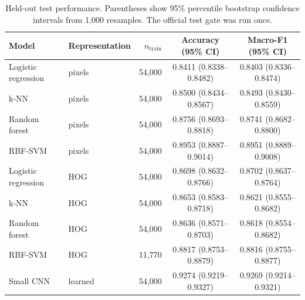 \begin{table}[t]
\centering
\caption{Held-out test performance. Parentheses show 95\% percentile bootstrap confidence intervals from 1,000 resamples. The official test gate was run once.}
\label{tab:results}
\small
\begin{tabular}{llrcc}
\toprule
Model & Representation & $n_{\mathrm{train}}$ & Accuracy (95\% CI) & Macro-F1 (95\% CI) \\
\midrule
Logistic regression & pixels & 54,000 & 0.8411 (0.8338--0.8482) & 0.8403 (0.8336--0.8474) \\
k-NN & pixels & 54,000 & 0.8500 (0.8434--0.8567) & 0.8493 (0.8430--0.8559) \\
Random forest & pixels & 54,000 & 0.8756 (0.8693--0.8818) & 0.8741 (0.8682--0.8800) \\
RBF-SVM & pixels & 54,000 & 0.8953 (0.8887--0.9014) & 0.8951 (0.8889--0.9008) \\
Logistic regression & HOG & 54,000 & 0.8698 (0.8632--0.8766) & 0.8702 (0.8637--0.8764) \\
k-NN & HOG & 54,000 & 0.8653 (0.8583--0.8718) & 0.8621 (0.8555--0.8682) \\
Random forest & HOG & 54,000 & 0.8636 (0.8571--0.8703) & 0.8618 (0.8554--0.8682) \\
RBF-SVM & HOG & 11,770 & 0.8817 (0.8753--0.8879) & 0.8816 (0.8755--0.8877) \\
Small CNN & learned & 54,000 & 0.9274 (0.9219--0.9327) & 0.9269 (0.9214--0.9321) \\
\bottomrule
\end{tabular}
\end{table}
